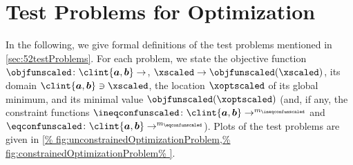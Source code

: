 \chapter{Test Problems for Optimization}
\label{chap:a20testProblems}

In the following, we give formal definitions of the test problems
mentioned in \cref{sec:52testProblems}.
For each problem, we state the objective function
$\objfunscaled\colon \clint{\*a, \*b} \to \real$,
$\xscaled \to \objfunscaled(\xscaled)$,
its domain $\clint{\*a, \*b} \ni \xscaled$,
the location $\xoptscaled$ of its global minimum, and
its minimal value $\objfunscaled(\xoptscaled)$
(and, if any, the constraint functions
$\ineqconfunscaled\colon \clint{\*a, \*b} \to \real^{m_{\ineqconfunscaled}}$
and $\eqconfunscaled\colon \clint{\*a, \*b} \to \real^{m_{\eqconfunscaled}}$).
Plots of the test problems are given in
\cref{%
  fig:unconstrainedOptimizationProblem,%
  fig:constrainedOptimizationProblem%
}.

{
  \setlength{\abovedisplayskip}{5pt plus 1pt minus 2.5pt}
  
  \newcommand*{\centertestfunline}[1]{%
    \mathclap{\hphantom{\mathrm{(B.99a)}}#1}%
  }
  
  
  
}

\cleardoublepage
